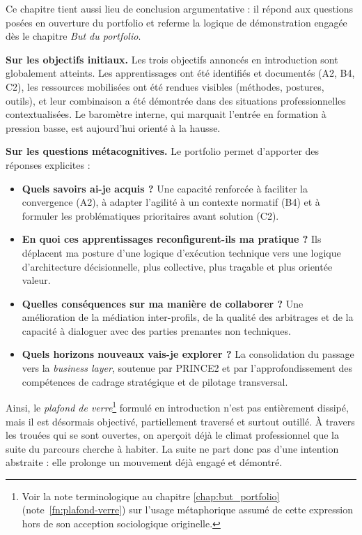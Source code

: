 Ce chapitre tient aussi lieu de conclusion argumentative : il répond aux questions posées en ouverture du portfolio et referme la logique de démonstration engagée dès le chapitre \textit{But du portfolio}.

\textbf{Sur les objectifs initiaux.}
Les trois objectifs annoncés en introduction sont globalement atteints. Les apprentissages ont été identifiés et documentés (A2, B4, C2), les ressources mobilisées ont été rendues visibles (méthodes, postures, outils), et leur combinaison a été démontrée dans des situations professionnelles contextualisées. Le baromètre interne, qui marquait l'entrée en formation à pression basse, est aujourd'hui orienté à la hausse.

\textbf{Sur les questions métacognitives.}
Le portfolio permet d'apporter des réponses explicites :
\begin{itemize}
  \item \textbf{Quels savoirs ai-je acquis ?} Une capacité renforcée à faciliter la convergence (A2), à adapter l'agilité à un contexte normatif (B4) et à formuler les problématiques prioritaires avant solution (C2).
  \item \textbf{En quoi ces apprentissages reconfigurent-ils ma pratique ?} Ils déplacent ma posture d'une logique d'exécution technique vers une logique d'architecture décisionnelle, plus collective, plus traçable et plus orientée valeur.
  \item \textbf{Quelles conséquences sur ma manière de collaborer ?} Une amélioration de la médiation inter-profils, de la qualité des arbitrages et de la capacité à dialoguer avec des parties prenantes non techniques.
  \item \textbf{Quels horizons nouveaux vais-je explorer ?} La consolidation du passage vers la \textit{business layer}, soutenue par PRINCE2 et par l'approfondissement des compétences de cadrage stratégique et de pilotage transversal.
\end{itemize}

Ainsi, le \textit{plafond de verre}\footnote{Voir la note terminologique au chapitre \ref{chap:but_portfolio} (note~\ref{fn:plafond-verre}) sur l'usage métaphorique assumé de cette expression hors de son acception sociologique originelle.} formulé en introduction n'est pas entièrement dissipé, mais il est désormais objectivé, partiellement traversé et surtout outillé. À travers les trouées qui se sont ouvertes, on aperçoit déjà le climat professionnel que la suite du parcours cherche à habiter. La suite ne part donc pas d'une intention abstraite : elle prolonge un mouvement déjà engagé et démontré.

